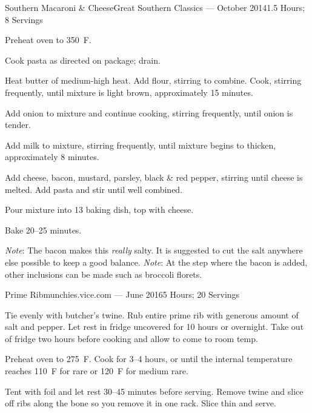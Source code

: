 \documentclass{article}
\begin{document}
\begin{recipe}{Southern Macaroni \& Cheese}{Great Southern Classics --- October 2014}{1.5 Hours; 8 Servings}

   \newstep
   Preheat oven to 350\ \0F.

   Cook pasta as directed on package; drain.

   Heat butter of medium-high heat.  Add flour, stirring to combine.  Cook,
   stirring frequently, until mixture is light brown, approximately 15 minutes.

   Add onion to mixture and continue cooking, stirring frequently, until onion
   is tender.

   Add milk to mixture, stirring frequently, until mixture begins to thicken,
   approximately 8 minutes.


   Add cheese, bacon, mustard, parsley, black \& red pepper, stirring until
   cheese is melted.  Add pasta and stir until well combined.

   Pour mixture into 13 baking dish, top with cheese.

   \newstep
   Bake 20--25 minutes.

   \freeform
   \emph{Note}: The bacon makes this \emph{really} salty.  It is suggested to
   cut the salt anywhere else possible to keep a good balance.
   \newline\newline
   \emph{Note}: At the step where the bacon is added, other inclusions can be
   made such as broccoli florets.

\end{recipe}

\begin{recipe}{Prime Rib}{munchies.vice.com --- June 2016}{5 Hours; 20 Servings}

   Tie evenly with butcher's twine. Rub entire prime rib with generous amount of
   salt and pepper. Let rest in fridge uncovered for 10 hours or overnight.
   Take out of fridge two hours before cooking and allow to come to room temp.

   \newstep
   Preheat oven to 275\ \0F.  Cook for 3--4 hours, or until the internal
   temperature reaches 110\ \0F for rare or 120\ \0F for medium rare.

   \newstep 
   Tent with foil and let rest 30--45 minutes before serving.  Remove twine and
   slice off ribs along the bone so you remove it in one rack. Slice thin and
   serve.

\end{recipe}
\end{document}
